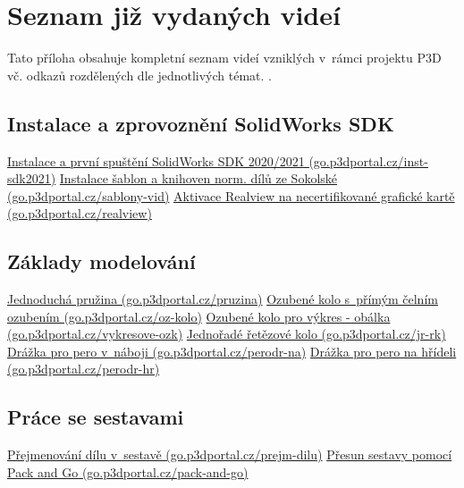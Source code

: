 \chapter{Seznam již vydaných videí} \label{released-videos}
Tato příloha obsahuje kompletní seznam videí vzniklých v~rámci projektu P3D vč. odkazů rozdělených dle jednotlivých témat. \newline
\noindent{}.

\section{Instalace a zprovoznění SolidWorks SDK} \label{videa-instalace}
\href{https://go.p3dportal.cz/inst-sdk2021}{Instalace a první spuštění SolidWorks SDK 2020/2021 (go.p3dportal.cz/inst-sdk2021)} \newline
\href{https://go.p3dportal.cz/sablony-vid}{Instalace šablon a knihoven norm. dílů ze Sokolské (go.p3dportal.cz/sablony-vid)} \newline
\href{https://go.p3dportal.cz/realview}{Aktivace Realview na necertifikované grafické kartě (go.p3dportal.cz/realview)} \newline

\section{Základy modelování} \label{videa-modelovani}
\href{https://go.p3dportal.cz/pruzina}{Jednoduchá pružina (go.p3dportal.cz/pruzina)} \newline
\href{https://go.p3dportal.cz/oz-kolo}{Ozubené kolo s~přímým čelním ozubením (go.p3dportal.cz/oz-kolo)} \newline
\href{https://go.p3dportal.cz/vykresove-ozk}{Ozubené kolo pro výkres - obálka (go.p3dportal.cz/vykresove-ozk)} \newline
\href{https://go.p3dportal.cz/jr-rk}{Jednořadé řetězové kolo (go.p3dportal.cz/jr-rk)} \newline
\href{https://go.p3dportal.cz/perodr-na}{Drážka pro pero v~náboji (go.p3dportal.cz/perodr-na)} \newline
\href{https://go.p3dportal.cz/perodr-hr}{Drážka pro pero na hřídeli (go.p3dportal.cz/perodr-hr)} \newline

\section{Práce se sestavami} \label{videa-sestavy}
\href{https://go.p3dportal.cz/prejm-dilu}{Přejmenování dílu v~sestavě (go.p3dportal.cz/prejm-dilu)} \newline
\href{https://go.p3dportal.cz/pack-and-go}{Přesun sestavy pomocí Pack and Go (go.p3dportal.cz/pack-and-go)} \newline

